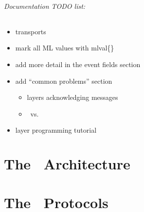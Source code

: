 \documentclass[11pt]{article}
\begin{document}
\paragraph{Documentation TODO list:}
\begin{itemize}
\item transports
\item mark all ML values with mlval\{\}
\item add more detail in the event fields section
\item add ``common problems'' section
\begin{itemize}
\item layers acknowledging messages
\item \EInit\ vs. \EView
\end{itemize}
\item layer programming tutorial
\end{itemize}

\newpage
\part{The \ensemble\ Architecture}







\newpage
\part{The \ensemble\ Protocols}

\appendix



%
%
\end{document}
